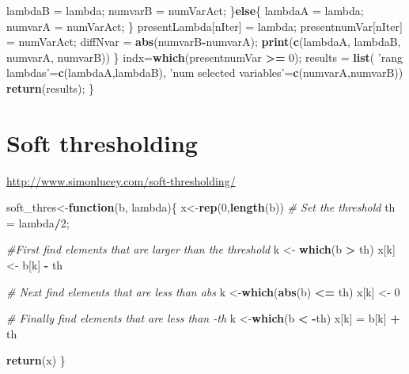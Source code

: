 \documentclass[]{book}
\newenvironment{Shaded}{\begin{snugshade}}{\end{snugshade}}
\newcommand{\KeywordTok}[1]{\textcolor[rgb]{0.13,0.29,0.53}{\textbf{#1}}}
\newcommand{\DecValTok}[1]{\textcolor[rgb]{0.00,0.00,0.81}{#1}}
\newcommand{\StringTok}[1]{\textcolor[rgb]{0.31,0.60,0.02}{#1}}
\newcommand{\CommentTok}[1]{\textcolor[rgb]{0.56,0.35,0.01}{\textit{#1}}}
\newcommand{\ControlFlowTok}[1]{\textcolor[rgb]{0.13,0.29,0.53}{\textbf{#1}}}
\newcommand{\OperatorTok}[1]{\textcolor[rgb]{0.81,0.36,0.00}{\textbf{#1}}}
\newcommand{\NormalTok}[1]{#1}
\begin{document}
\begin{Shaded}
\begin{Highlighting}[]
\NormalTok{      lambdaB =}\StringTok{ }\NormalTok{lambda;}
\NormalTok{      numvarB =}\StringTok{ }\NormalTok{numVarAct;}
\NormalTok{    \}}\ControlFlowTok{else}\NormalTok{\{}
\NormalTok{      lambdaA =}\StringTok{ }\NormalTok{lambda;}
\NormalTok{      numvarA =}\StringTok{ }\NormalTok{numVarAct;}
\NormalTok{    \}}
\NormalTok{    presentLambda[nIter] =}\StringTok{ }\NormalTok{lambda;}
\NormalTok{    presentnumVar[nIter] =}\StringTok{ }\NormalTok{numVarAct;}
\NormalTok{    diffNvar =}\StringTok{ }\KeywordTok{abs}\NormalTok{(numvarB}\OperatorTok{-}\NormalTok{numvarA);}
    \KeywordTok{print}\NormalTok{(}\KeywordTok{c}\NormalTok{(lambdaA, lambdaB, numvarA, numvarB))}
\NormalTok{  \}}
\NormalTok{  indx=}\KeywordTok{which}\NormalTok{(presentnumVar }\OperatorTok{>=}\StringTok{ }\DecValTok{0}\NormalTok{);}
\NormalTok{  results =}\StringTok{ }\KeywordTok{list}\NormalTok{( }\StringTok{'rang lambdas'}\NormalTok{=}\KeywordTok{c}\NormalTok{(lambdaA,lambdaB), }\StringTok{'num selected variables'}\NormalTok{=}\KeywordTok{c}\NormalTok{(numvarA,numvarB))}
  \KeywordTok{return}\NormalTok{(results);}
\NormalTok{\}}
\end{Highlighting}
\end{Shaded}

\section{Soft thresholding}\label{soft-thresholding}

\url{http://www.simonlucey.com/soft-thresholding/}

\begin{Shaded}
\begin{Highlighting}[]
\NormalTok{soft_thres<-}\ControlFlowTok{function}\NormalTok{(b, lambda)\{}
\NormalTok{  x<-}\KeywordTok{rep}\NormalTok{(}\DecValTok{0}\NormalTok{,}\KeywordTok{length}\NormalTok{(b))}
  \CommentTok{# Set the threshold}
\NormalTok{  th =}\StringTok{ }\NormalTok{lambda}\OperatorTok{/}\DecValTok{2}\NormalTok{; }
  
  \CommentTok{#First find elements that are larger than the threshold}
\NormalTok{  k <-}\StringTok{ }\KeywordTok{which}\NormalTok{(b }\OperatorTok{>}\StringTok{ }\NormalTok{th)}
\NormalTok{  x[k] <-}\StringTok{ }\NormalTok{b[k] }\OperatorTok{-}\StringTok{ }\NormalTok{th }
  
  \CommentTok{# Next find elements that are less than abs}
\NormalTok{  k <-}\KeywordTok{which}\NormalTok{(}\KeywordTok{abs}\NormalTok{(b) }\OperatorTok{<=}\StringTok{ }\NormalTok{th)}
\NormalTok{  x[k] <-}\StringTok{ }\DecValTok{0} 
  
  \CommentTok{# Finally find elements that are less than -th}
\NormalTok{  k <-}\KeywordTok{which}\NormalTok{(b }\OperatorTok{<}\StringTok{ }\OperatorTok{-}\NormalTok{th)}
\NormalTok{  x[k] =}\StringTok{ }\NormalTok{b[k] }\OperatorTok{+}\StringTok{ }\NormalTok{th}
  
  \KeywordTok{return}\NormalTok{(x)}
\NormalTok{\}}
\end{Highlighting}
\end{Shaded}
\end{document}
